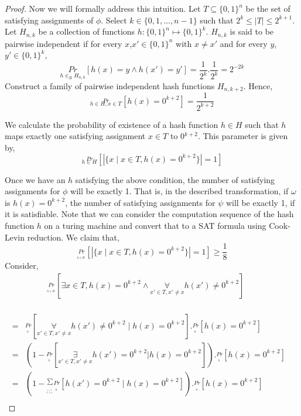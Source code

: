 \documentclass[11pt]{article}
\begin{document}
\begin{proof}
Now we will formally address this intuition.
Let $T \subseteq \{0,1\}^n$ be the set of satisfying assignments of $\phi$. Select $k \in \{0,1,...,n-1\}$ such that $2^k \leq |T| \leq 2^{k+1}$. Let $H_{n,k}$ be a collection of functions $h: \{0,1\}^n \mapsto \{0,1\}^k$. $H_{n,k}$ is said to be pairwise independent if for every $x$,$x' \in \{0,1\}^n$ with $x \neq x'$ and for every $y$,$y' \in \{0, 1\}^k$, 
\[ \underset{h \in_R H_{n,k}}{Pr}[h(x) = y \wedge h(x') =y'] = \frac{1}{2^k}.\frac{1}{2^k}=2^{ -2k}
\]
Construct a family of pairwise independent hash functions $H_{n,k+2}$. Hence, 
\[
\stackrel{Pr}{_{h \in H,x \in T}}[h(x)=0^{k+2}]=\frac{1}{2^{k+2}}
\]

We calculate the probability of existence of a hash function $h \in H$ such that $h$ maps exactly one satisfying assignment $x \in T$ to 0$^{k+2}$. This parameter is given by,
\[
\stackrel{Pr}{_{h \in H}}[|\{x \mid x \in T, h(x)=0^{k+2}\}|=1]
\]

Once we have an $h$ satisfying the above condition, the number of satisfying assignments for $\phi$ will be exactly 1. That is, in the described transformation, if $\omega$ is $h(x)=0^{k+2}$, the number of satisfying assignments for $\psi$ will be exactly 1, if it is satisfiable. Note that we can consider the computation sequence of the hash function $h$ on a turing machine and convert that to a SAT formula using Cook-Levin reduction. We claim that,  
\[
\stackrel{Pr}{_{_{_{h \in H}}}}[|\{x \mid x \in T, h(x)=0^{k+2}\}|=1] \geq \frac{1}{8}
\]
Consider, 
\begin{eqnarray*}
\stackrel{Pr}{_{_{_{h \in H}}}}[\exists x \in T, h(x)=0^{k+2} \wedge \underset{x' \in T,x' \neq x}\forall h(x') \neq 
0^{k+2}] & & \\
\end{eqnarray*}

\begin{eqnarray*}
= & \stackrel{Pr}{_{_{_{h}}}}[\underset{x' \in T,x' \neq x}\forall h(x') \neq 0^{k+2} \mid h(x)=0^{k+2}].\stackrel{Pr}{_{_{_{h}}}}[h(x)=0^{k+2}] & \\
= & (1-\stackrel{Pr}{_{_{_{h}}}}[\underset{x' \in T,x' \neq x}\exists h(x') = 0^{k+2}|h(x)=0^{k+2}]).\stackrel{Pr}{_{_{_{h}}}}[h(x)=0^{k+2}] & \\
= & (1-\stackrel{\sum}{_{_{_{_{\stackrel{x' \in T}{x' \neq x}}}}}}\stackrel{Pr}{_{_{_{h}}}}[h(x')=0^{k+2}\mid h(x)=0^{k+2}]).\stackrel{Pr}{_{_{_{h}}}}[h(x)=0^{k+2}] & \\
\end{eqnarray*}


\end{proof}
\end{document}
